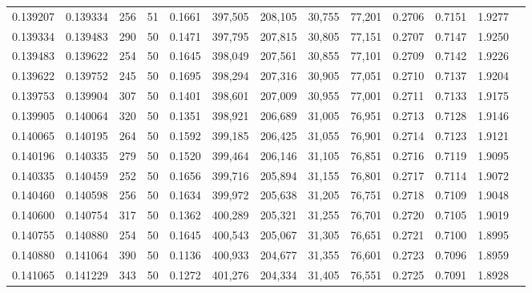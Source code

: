 \begin{tabular}{rrrrrrrrrrrrr}
0.139207 & 0.139334 &   256 &  51 &                                     0.1661 & 397,505 & 208,105 &  30,755 &  77,201 & 0.2706 & 0.7151 & 1.9277 \\
0.139334 & 0.139483 &   290 &  50 &                                     0.1471 & 397,795 & 207,815 &  30,805 &  77,151 & 0.2707 & 0.7147 & 1.9250 \\
0.139483 & 0.139622 &   254 &  50 &                                     0.1645 & 398,049 & 207,561 &  30,855 &  77,101 & 0.2709 & 0.7142 & 1.9226 \\
0.139622 & 0.139752 &   245 &  50 &                                     0.1695 & 398,294 & 207,316 &  30,905 &  77,051 & 0.2710 & 0.7137 & 1.9204 \\
0.139753 & 0.139904 &   307 &  50 &                                     0.1401 & 398,601 & 207,009 &  30,955 &  77,001 & 0.2711 & 0.7133 & 1.9175 \\
0.139905 & 0.140064 &   320 &  50 &                                     0.1351 & 398,921 & 206,689 &  31,005 &  76,951 & 0.2713 & 0.7128 & 1.9146 \\
0.140065 & 0.140195 &   264 &  50 &                                     0.1592 & 399,185 & 206,425 &  31,055 &  76,901 & 0.2714 & 0.7123 & 1.9121 \\
0.140196 & 0.140335 &   279 &  50 &                                     0.1520 & 399,464 & 206,146 &  31,105 &  76,851 & 0.2716 & 0.7119 & 1.9095 \\
0.140335 & 0.140459 &   252 &  50 &                                     0.1656 & 399,716 & 205,894 &  31,155 &  76,801 & 0.2717 & 0.7114 & 1.9072 \\
0.140460 & 0.140598 &   256 &  50 &                                     0.1634 & 399,972 & 205,638 &  31,205 &  76,751 & 0.2718 & 0.7109 & 1.9048 \\
0.140600 & 0.140754 &   317 &  50 &                                     0.1362 & 400,289 & 205,321 &  31,255 &  76,701 & 0.2720 & 0.7105 & 1.9019 \\
0.140755 & 0.140880 &   254 &  50 &                                     0.1645 & 400,543 & 205,067 &  31,305 &  76,651 & 0.2721 & 0.7100 & 1.8995 \\
0.140880 & 0.141064 &   390 &  50 &                                     0.1136 & 400,933 & 204,677 &  31,355 &  76,601 & 0.2723 & 0.7096 & 1.8959 \\
0.141065 & 0.141229 &   343 &  50 &                                     0.1272 & 401,276 & 204,334 &  31,405 &  76,551 & 0.2725 & 0.7091 & 1.8928 \\

\end{tabular}
